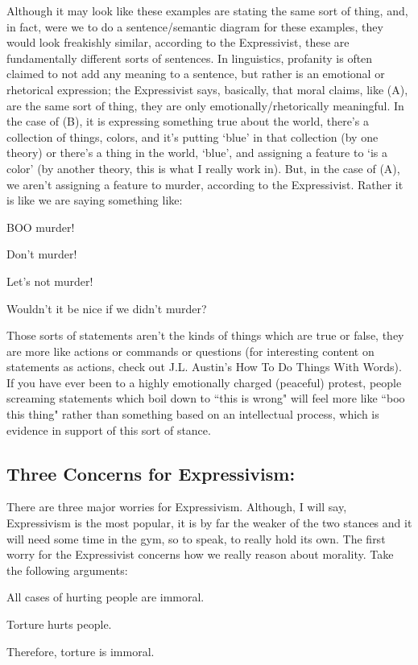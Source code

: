 Although it may look like these examples are stating the same sort of thing, and, in fact, were we to  do a sentence/semantic diagram for these examples, they would look freakishly similar, according to the Expressivist, these are fundamentally different sorts of sentences. In linguistics, profanity is often claimed to not add any meaning to a sentence, but rather is an emotional or rhetorical expression; the Expressivist says, basically, that moral claims, like (A), are the same sort of thing, they are only emotionally/rhetorically meaningful. In the case of (B), it is expressing something true about the world, there's a collection of things, colors, and it's putting `blue' in that collection (by one theory) or there's a thing in the world, `blue', and assigning a feature to `is a color' (by another theory, this is what I really work in). But, in the case of (A), we aren’t assigning a feature to murder, according to the Expressivist. Rather it is like we are saying something like:
\begin{earg}
    \item[]BOO murder!
    \item[]Don’t murder!
    \item[]Let’s not murder!
    \item[]Wouldn’t it be nice if we didn’t murder?
\end{earg}
Those sorts of statements aren’t the kinds of things which are true or false, they are more like actions or commands or questions (for interesting content on statements as actions, check out J.L. Austin's How To Do Things With Words). If you have ever been to a highly emotionally charged (peaceful) protest, people screaming statements which boil down to ``this is wrong" will feel more like ``boo this thing" rather than something based on an intellectual process, which is evidence in support of this sort of stance. 

\subsection{Three Concerns for Expressivism:}

There are three major worries for Expressivism. Although, I will say, Expressivism is the most popular, it is by far the weaker of the two stances and it will need some time in the gym, so to speak, to really hold its own. The first worry for the Expressivist concerns how we really reason about morality. Take the following arguments:

    \begin{earg}
    \item[]All cases of hurting people are immoral.
    \item[]Torture hurts people.
    \item[]Therefore, torture is immoral.
   \end{earg}

